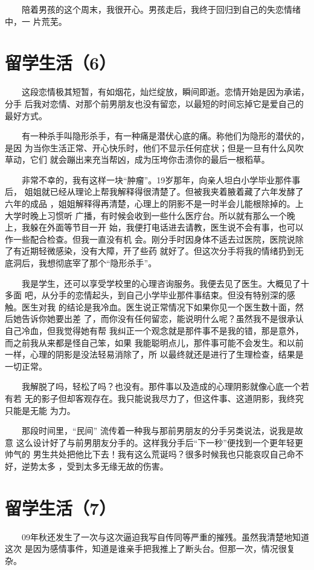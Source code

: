 \documentclass[12pt]{book}
\begin{document}
　　陪着男孩的这个周末，我很开心。男孩走后，我终于回归到自己的失恋情绪中，一
片荒芜。
\section{留学生活（6）}
\label{sec-6-6}

　　这段恋情极其短暂，有如烟花，灿烂绽放，瞬间即逝。恋情开始是因为承诺，分手
后我对恋情、对那个前男朋友也没有留恋，以最短的时间忘掉它是爱自己的最好方式。

　　有一种杀手叫隐形杀手，有一种痛是潜伏心底的痛。称他们为隐形的潜伏的，是因
为当你生活正常、开心快乐时，他们不显示任何症状；但是一旦有什么风吹草动，它们
就会蹦出来充当帮凶，成为压垮你击溃你的最后一根稻草。

　　非常不幸的，我有这样一块“肿瘤”。19岁那年，向亲人坦白小学毕业那件事后，
姐姐就已经从理论上帮我解释得很清楚了。但被我夹着腋着藏了六年发酵了六年的成品
，姐姐解释得再清楚，心理上的阴影不是一时半会儿能根除掉的。上大学时晚上习惯听
广播，有时候会收到一些什么医疗台。所以就有那么一个晚上，我躲在外面等节目一开
始，我便打电话进去请教，医生说不会有事，也可以作一些配合检查。但我一直没有机
会。刚分手时因身体不适去过医院，医院说除了有近期轻微感染，没有大障，开了些药
就好了。但这次分手将我的情绪扔到无底洞后，我想彻底宰了那个“隐形杀手”。

　　我是学生，还可以享受学校里的心理咨询服务。我便去见了医生。大概见了十多面
吧，从分手的恋情起头，到自己小学毕业那件事结束。但没有特别深的感触。医生对我
的结论是我冷血。医生说正常情况下如果你见一个医生数十面，然后她告诉你她要出差
了，而你没有任何留恋，能说明什么呢？虽然我不是很承认自己冷血，但我觉得她有帮
我纠正一个观念就是那件事不是我的错，那是意外，而之前我从来都是怪自己笨，如果
我能聪明点儿，那件事可能不会发生。和以前一样，心理的阴影是没法轻易消除了，所
以最终就还是进行了生理检查，结果是一切正常。

　　我解脱了吗，轻松了吗？也没有。那件事以及造成的心理阴影就像心底一个若有若
无的影子但却客观存在。我只能说我尽力了，但这件事、这道阴影，我终究只能是无能
为力。

　　那段时间里，“民间” 流传着一种我与那前男朋友的分手另类说法，说我是故意
这么设计好了与前男朋友分手的。这样我分手后“下一秒”便找到一个更年轻更帅气的
男生共处把他比下去！我有这么荒诞吗？很多时候我也只能哀叹自己命不好，逆势太多
，受到太多无缘无故的伤害。
\section{留学生活（7）}
\label{sec-6-7}

　　09年秋还发生了一次与这次逼迫我写自传同等严重的摧残。虽然我清楚地知道这次
是因为感情事件，知道是谁亲手把我推上了断头台。但那一次，情况很复杂。
\end{document}
